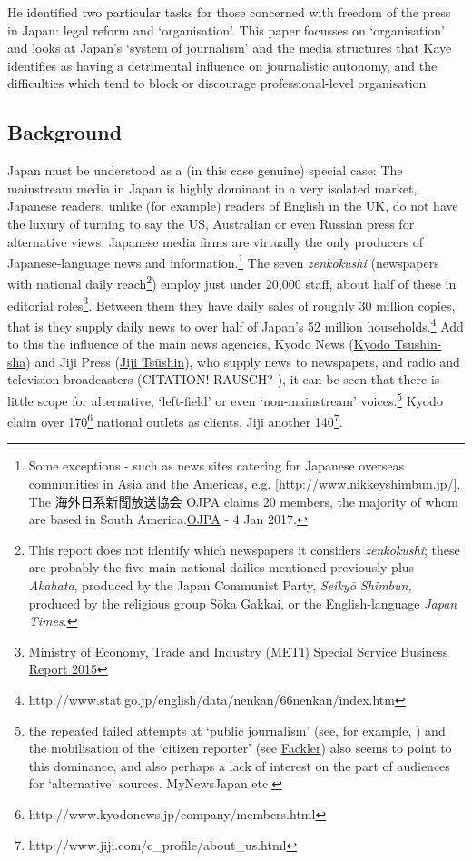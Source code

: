 \documentclass[11pt, headings=normal]{scrartcl}
\begin{document}
He identified two particular tasks for those concerned with freedom of
the press in Japan: legal reform and `organisation'. This paper focusses
on `organisation' and looks at Japan's `system of journalism' and the
media structures that Kaye identifies as having a detrimental influence
on journalistic autonomy, and the difficulties which tend to block or
discourage professional-level organisation.

\hypertarget{background}{%
\subsection{Background}\label{background}}

Japan must be understood as a (in this case genuine) special case: The
mainstream media in Japan is highly dominant in a very isolated market,
Japanese readers, unlike (for example) readers of English in the UK, do
not have the luxury of turning to say the US, Australian or even Russian
press for alternative views. Japanese media firms are virtually the only
producers of Japanese-language news and information.\footnote{Some
  exceptions - such as news sites catering for Japanese overseas
  communities in Asia and the Americas, e.g.
  {[}http://www.nikkeyshimbun.jp/{]}. The 海外日系新聞放送協会 OJPA
  claims 20 members, the majority of whom are based in South
  America.\href{http://www.jadesas.or.jp/shinbun/}{OJPA} - 4 Jan 2017.}
The seven \emph{zenkokushi} (newspapers with national daily
reach\footnote{This report does not identify which newspapers it
  considers \emph{zenkokushi}; these are probably the five main national
  dailies mentioned previously plus \emph{Akahata}, produced by the
  Japan Communist Party, \emph{Seikyō Shimbun}, produced by the
  religious group Sōka Gakkai, or the English-language \emph{Japan
  Times}.}) employ just under 20,000 staff, about half of these in
editorial roles\footnote{\href{http://www.meti.go.jp/statistics/tyo/tokusabizi/result-2/h27.html}{Ministry
  of Economy, Trade and Industry (METI) Special Service Business Report
  2015}}. Between them they have daily sales of roughly 30 million
copies, that is they supply daily news to over half of Japan's 52
million households.\footnote{http://www.stat.go.jp/english/data/nenkan/66nenkan/index.htm}
Add to this the influence of the main news agencies, Kyodo News
(\href{http://www.kyodonews.jp/english/}{Kyōdo Tsūshin-sha}) and Jiji
Press (\href{http://jen.jiji.com/}{Jiji Tsūshin}), who supply news to
newspapers, and radio and television broadcasters\autocite[59]{JMH:2015}
(CITATION! RAUSCH? \autocite{Rausch:2012}), it can be seen that there is
little scope for alternative, `left-field' or even `non-mainstream'
voices.\footnote{the repeated failed attempts at `public journalism'
  (see, for example, \textcite{ItoT:2005}) and the mobilisation of the
  `citizen reporter' (see
  \href{http://www.nytimes.com/2010/06/21/world/asia/21japan.html}{Fackler})
  also seems to point to this dominance, and also perhaps a lack of
  interest on the part of audiences for `alternative' sources.
  MyNewsJapan etc.} Kyodo claim over 170\footnote{http://www.kyodonews.jp/company/members.html}
national outlets as clients, Jiji another 140\footnote{http://www.jiji.com/c\_profile/about\_us.html}.
\end{document}
